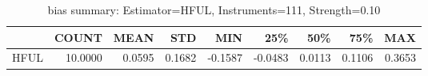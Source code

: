 \begin{table}[ht]
\centering
\caption{bias summary: Estimator=HFUL, Instruments=111, Strength=0.10}
\begin{tabular}{lrrrrrrrr}
\toprule
 & COUNT & MEAN & STD & MIN & 25\% & 50\% & 75\% & MAX \\
\midrule
HFUL & 10.0000 & 0.0595 & 0.1682 & -0.1587 & -0.0483 & 0.0113 & 0.1106 & 0.3653 \\
\bottomrule
\end{tabular}
\end{table}
